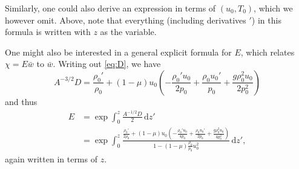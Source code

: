 \documentclass[11pt,twoside,reqno,centertags]{amsart}
\theoremstyle{definition}
\newcommand{\dd}{\mathrm d}
\begin{document}
Similarly, one could also derive an expression in terms of $(u_0,T_0)$, which we however omit. Above, note that everything (including derivatives $'$) in this formula is written with $z$ as the variable.

One might also be interested in a general explicit formula for $E$, which relates $\chi=E\bar w$ to $\bar w$. Writing out \eqref{eq:D}, we have
\[A^{-3/2}D=\frac{\rho_0'}{\rho_0}+(1-\mu)u_0\left(-\frac{\rho_0'u_0}{2p_0}+\frac{\rho_0u_0'}{p_0}+\frac{g\rho_0^2u_0}{2p_0^2}\right)\]
and thus
\begin{align*}
E&=\exp\int_0^z\frac{A^{-1/2}D}{2}\,\dd z'\\
&=\exp\int_0^z\frac{\frac{\rho_0'}{2\rho_0}+(1-\mu)u_0\left(-\frac{\rho_0'u_0}{4p_0}+\frac{\rho_0u_0'}{2p_0}+\frac{g\rho_0^2u_0}{4p_0^2}\right)}{1-(1-\mu)\frac{\rho_0}{p_0}u_0^2}\,\dd z',
\end{align*}
again written in terms of $z$.
\end{document}
